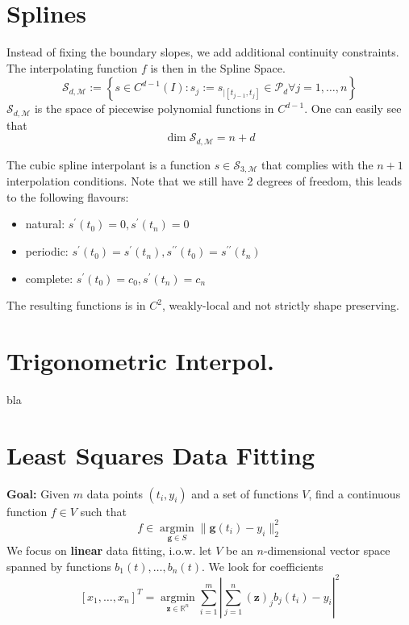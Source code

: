 \section{Splines}
Instead of fixing the boundary slopes, we add additional continuity constraints. The interpolating function $f$ is then in the Spline Space.\\

$${\scriptstyle
\mathcal{S}_{d, \mathcal{M}}:=\left\{s \in C^{d-1}(I): s_{j}:=s_{\mid\left[t_{j-1}, t_{j}\right]} \in \mathcal{P}_{d} \forall j=1, \ldots, n\right\}}
$$
$\mathcal{S}_{d, \mathcal{M}}$ is the space of piecewise polynomial functions in $C^{d-1}$. One can easily see that $$
\operatorname{dim} \mathcal{S}_{d, \mathcal{M}}=n+d
$$

 The cubic spline interpolant is a function $s \in \mathcal{S}_{3, \mathcal{M}}$ that complies with the $n+1$ interpolation conditions. Note that we still have 2 degrees of freedom, this leads to the following flavours:
\begin{itemize}
	\item natural: $s^{\prime}\left(t_{0}\right)=0, s^{\prime}\left(t_{n}\right)=0$
	\item periodic: $s^{\prime}\left(t_{0}\right)=s^{\prime}\left(t_{n}\right), s^{\prime\prime}\left(t_{0}\right)=s^{\prime\prime}\left(t_{n}\right)$
	\item complete: $s^{\prime}\left(t_{0}\right)=c_{0}, s^{\prime}\left(t_{n}\right)=c_{n}$
\end{itemize}
The resulting functions is in $C^2$, weakly-local and not strictly shape preserving.

\section{Trigonometric Interpol.}
bla

\section{Least Squares Data Fitting}
\textbf{Goal:} Given $m$ data points $(t_i, y_i)$ and a set of functions $V$, find a continuous function $f\in V$ such that
$$
f \in \underset{\mathbf{g} \in S}{\operatorname{argmin}}\|\textbf{g}(t_i)-y_i\|_{2}^{2}
$$
We focus on \textbf{linear} data fitting, i.o.w. let $V$ be an $n$-dimensional vector space spanned by functions $b_1(t), \dots, b_n(t)$. We look for coefficients 
$$[x_1,\dots,x_n]^T=\underset{\mathbf{z} \in \mathbb{R}^{n}}{\operatorname{argmin}} \sum_{i=1}^{m}\left|\sum_{j=1}^{n}(\mathbf{z})_{j} b_{j}\left(t_{i}\right)-y_{i}\right|^{2}$$

